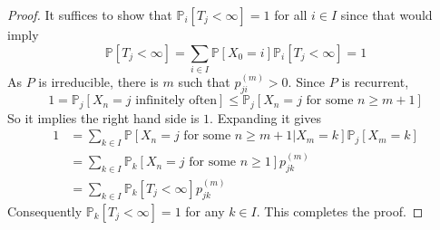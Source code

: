 \begin{proof}
    It suffices to show that $\mathbb P_i[T_j<\infty]=1$ for all $i\in I$ since that would imply
    $$\mathbb P[T_j<\infty]=\sum_{i\in I}\mathbb P[X_0=i]\mathbb P_i[T_j<\infty]=1$$
    As $P$ is irreducible, there is $m$ such that $p_{ji}^{(m)}>0$.
    Since $P$ is recurrent,
    $$1=\mathbb P_j[X_n=j\text{ infinitely often}]\le \mathbb P_j[X_n=j\text{ for some $n\ge m+1$}]$$
    So it implies the right hand side is $1$.
    Expanding it gives
    \begin{align*}
        1&=\sum_{k\in I}\mathbb P[X_n=j\text{ for some $n\ge m+1$}|X_m=k]\mathbb P_j[X_m=k]\\
        &=\sum_{k\in I}\mathbb P_k[X_n=j\text{ for some $n\ge 1$}]p_{jk}^{(m)}\\
        &=\sum_{k\in I}\mathbb P_k[T_j<\infty]p_{jk}^{(m)}
    \end{align*}
    Consequently $\mathbb P_k[T_j<\infty]=1$ for any $k\in I$.
    This completes the proof.
\end{proof}